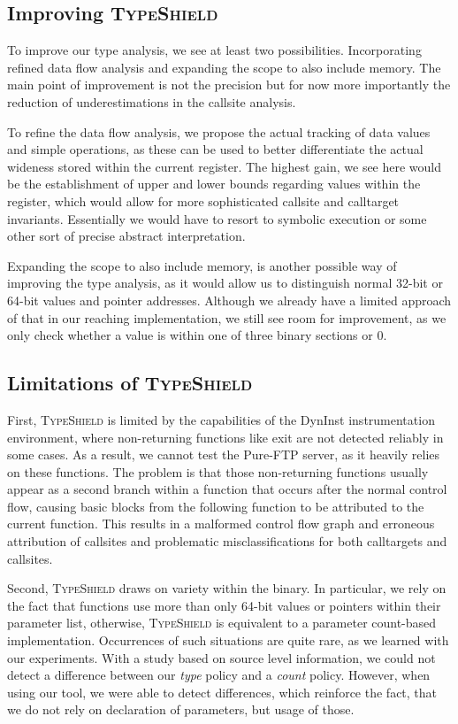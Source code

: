 \subsection{Improving \textsc{TypeShield}}
\label{section:venuesimp}
To improve our type analysis, we see at least two possibilities. Incorporating refined data flow analysis and 
expanding the scope to also include memory. The main point of improvement is not the precision but for now 
more importantly the reduction of underestimations in the callsite analysis.

To refine the data flow analysis, we propose the actual tracking of data values and simple operations, as these
can be used to better differentiate the actual wideness stored within the current register. The highest gain, 
we see here would be the establishment of upper and lower bounds regarding values within the register, which 
would allow for more sophisticated callsite and calltarget invariants. Essentially we would have to resort 
to symbolic execution or some other sort of precise abstract interpretation.

Expanding the scope to also include memory, is another possible way of improving the type analysis, as it 
would allow us to distinguish normal 32-bit or 64-bit values and pointer addresses. Although we already have a 
limited approach of that in our reaching implementation, we still see room for improvement, as we only check
whether a value is within one of three binary sections or 0.

\subsection{Limitations of \textsc{TypeShield}}
\label{section:limit}
First, \textsc{TypeShield} is limited by the capabilities of the DynInst instrumentation environment, where non-returning functions like exit are 
not detected reliably in some cases. As a result, we cannot test the Pure-FTP server, as it heavily relies on these functions. 
The problem is that those non-returning functions usually appear as a second branch within a function that occurs after the normal 
control flow, causing basic blocks from the following function to be attributed to the current function. This results in a malformed 
control flow graph and erroneous attribution of callsites and problematic misclassifications for both calltargets and callsites.

Second, \textsc{TypeShield} draws on variety within the binary. In particular, we rely on the fact that functions use more than only 
64-bit values or pointers within their parameter list, otherwise, \textsc{TypeShield} is equivalent to a parameter count-based implementation. 
Occurrences of such situations are quite rare, as we learned with our experiments. With a study based on source level information, we could not 
detect a difference between our \textit{type} policy and a \textit{count} policy. However, when using our tool, we were able to detect differences,
which reinforce the fact, that we do not rely on declaration of parameters, but usage of those.

